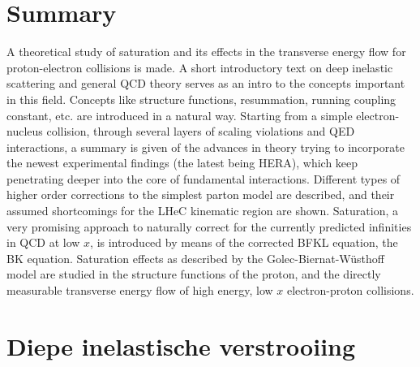 \documentclass[a4paper,11pt]{article}
\numberwithin{equation}{section} %
\begin{document}
\section*{Summary}
A theoretical study of saturation and its effects in the transverse energy flow for proton-electron collisions is made.
A short introductory text on deep inelastic scattering and general QCD theory serves as an intro to the concepts important in this field.
Concepts like structure functions, resummation, running coupling constant, etc. are introduced in a natural way.
Starting from a simple electron-nucleus collision, through several layers of scaling violations and QED interactions, a summary is given of the advances in theory trying to incorporate the newest experimental findings (the latest being HERA), which keep penetrating deeper into the core of fundamental interactions.
Different types of higher order corrections to the simplest parton model are described, and their assumed shortcomings for the LHeC kinematic region are shown.
Saturation, a very promising approach to naturally correct for the currently predicted infinities in QCD at low $x$, is introduced by means of the corrected BFKL equation, the BK equation.
Saturation effects as described by the Golec-Biernat-Wüsthoff model are studied in the structure functions of the proton, and the directly measurable transverse energy flow of high energy, low $x$ electron-proton collisions.

\thispagestyle{empty}
\newpage

\tableofcontents
\thispagestyle{empty}
\newpage

\section{Diepe inelastische verstrooiing}
\end{document}
